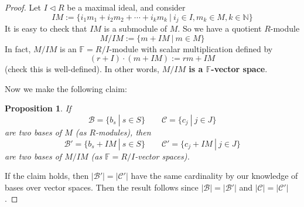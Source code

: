 \documentclass[11pt,openany]{book}
\theoremstyle{plain}
\newtheorem{claim}[claim]{Proposition}
\theoremstyle{definition}
\theoremstyle{remark}
\begin{document}
\begin{proof}
Let $I\triangleleft R$ be a maximal ideal, and consider $$IM:= \{i_1m_1 + i_2m_2 +\cdots + i_km_k\ |\ i_j\in I, m_k\in M, k\in \mathbb{N} \}$$
    It is easy to check that $IM$ is a submodule of $M$. So we have a quotient $R$-module $$M/IM:= \{m+IM\ |\ m\in M\}$$ 
    In fact, $M/IM$ is an $\mathbb{F} = R/I$-module with  scalar multiplication defined by $$(r+I)\cdot (m+IM):=rm+IM$$ (check this is well-defined). In other words, {\bf $M/IM$ is a $\mathbb{F}$-vector space}.

\medskip
    Now we make the following claim:
    \begin{claim}
    If 
    $$\mathcal{B}=\{b_s\ |\ s\in S\} \quad \quad \mathcal{C}=\{c_j\ |\ j \in J\}$$ are two bases of $M$ (as $R$-modules), then $$\mathcal{B}'=\{b_s+IM\ |\ s\in S\} \quad \quad \mathcal{C}'=\{c_j+IM\ |\ j\in J\}$$ 
    are two bases of $M/IM$ (as $\mathbb{F}= R/I$-vector spaces).
    \end{claim}
    If the claim holds, then $|\mathcal{B}'| = |\mathcal{C}'|$ have the same cardinality by our knowledge of bases over vector spaces. Then the result follows since $|\mathcal{B}| = |\mathcal{B}'|$ and $|\mathcal{C}| = |\mathcal{C}'|$.


\end{proof}
\end{document}
